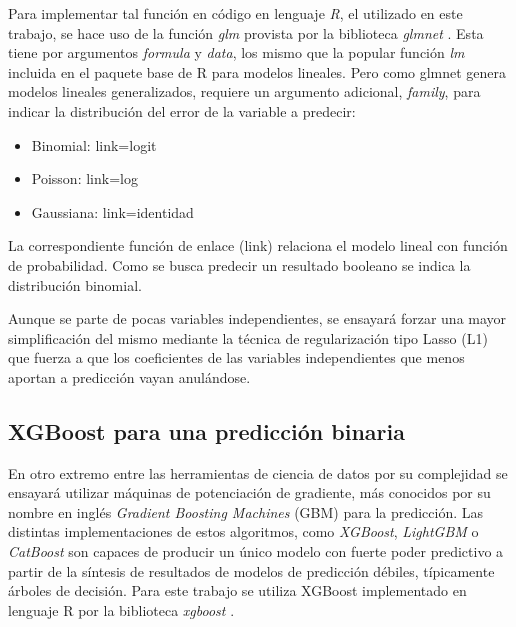 \documentclass[a4paper]{report}
\begin{document}
Para implementar tal función en código en lenguaje \emph{R}, el utilizado en este trabajo, se hace uso de la función \emph{glm} provista por la biblioteca \emph{glmnet} \cite{friedman_glmnet_2023}. 
Esta tiene por argumentos \emph{formula} y \emph{data}, los mismo que la popular función \emph{lm} incluida en el paquete base de R para modelos lineales.
Pero como glmnet genera modelos lineales generalizados, requiere un argumento adicional, \emph{family}, para indicar la distribución del error de la variable a predecir:
\begin{itemize}
	\item Binomial: link=logit
	\item Poisson: link=log
	\item Gaussiana: link=identidad
\end{itemize}
La correspondiente función de enlace (link) relaciona el modelo lineal con función de probabilidad.
Como se busca predecir un resultado booleano se indica la distribución binomial.

Aunque se parte de pocas variables independientes, se ensayará forzar una mayor simplificación del mismo mediante la técnica de regularización tipo Lasso (L1) que fuerza a que los coeficientes de las variables independientes que menos aportan a predicción vayan anulándose.



\subsection{XGBoost para una predicción binaria}

En otro extremo entre las herramientas de ciencia de datos por su complejidad se ensayará utilizar máquinas de potenciación de gradiente, más conocidos por su nombre en inglés \emph{Gradient Boosting Machines} (GBM) para la predicción.
Las distintas implementaciones de estos algoritmos, como \emph{XGBoost}, \emph{LightGBM} o \emph{CatBoost} son capaces de producir un único modelo con fuerte poder predictivo a partir de la síntesis de resultados de modelos de predicción débiles, típicamente árboles de decisión. 
Para este trabajo se utiliza XGBoost implementado en lenguaje R por la biblioteca \emph{xgboost} \cite{chen_xgboost_2024}.

\end{document}
